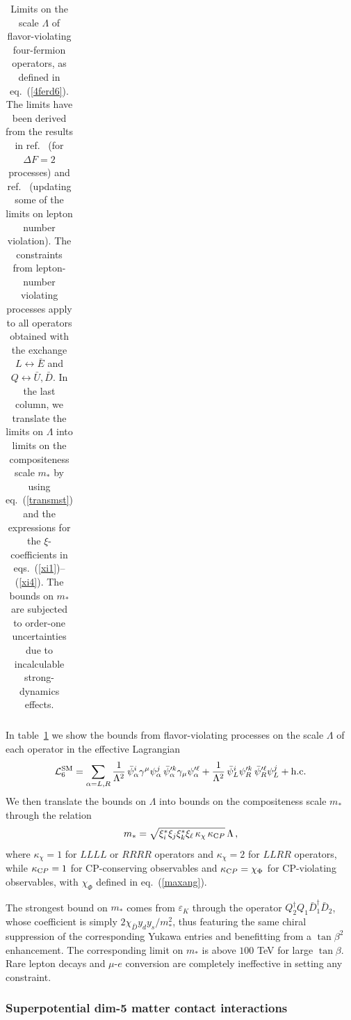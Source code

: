\documentclass[a4paper,12pt]{article}
\newcommand{\hc}{{\rm h.c.}}
\newcommand{\beq}{\begin{equation}}
\newcommand{\eeq}{\end{equation}}
\def\eq#1{eq.~(\ref{#1})}
\def\tab#1{table~\ref{#1}}
\def\eq#1{eq.~(\ref{#1})}
\def\mst{m_*}
\begin{document}
\begin{table}[t]
\begin{tabular}{|c|c|c|r|}
 \hline
 \end{tabular}
 \renewcommand{\arraystretch}{1}
 \caption{Limits on the scale $\Lambda$ of flavor-violating four-fermion operators, as defined in \eq{4ferd6}. The limits have been derived from the results in ref.~\cite{Bona:2024bue} (for $\Delta F =2$ processes) and ref.~\cite{Raidal:2008jk} (updating some of the limits on lepton number violation). The constraints from lepton-number violating processes apply to all operators obtained with the exchange $L \leftrightarrow {\bar E}$ and $Q \leftrightarrow {\bar U}, {\bar D}$. In the last column, we translate the limits on $\Lambda$ into limits on the compositeness scale $\mst$ by using \eq{transmst} and the expressions for the $\xi$-coefficients in eqs.~(\ref{xi1})--(\ref{xi4}). The bounds on $\mst$ are subjected to order-one uncertainties due to incalculable strong-dynamics effects.}
 \label{tab:4ferm}
 \end{table}
 
In \tab{tab:4ferm} we show the bounds from flavor-violating processes on the scale $\Lambda$ of each operator in the effective Lagrangian  
\beq
{\cal L}^{\rm SM}_6=
 \sum_{\alpha=L,R}\frac{1}{\Lambda^2}\, {\bar \psi}^{i}_{\alpha} \gamma^\mu {\psi}^j_{\alpha}\,
{\bar \psi}^{\prime k}_{\alpha} \gamma_\mu {\psi}^{\prime \ell}_{\alpha}+
\frac{1}{\Lambda^2}\, {\bar \psi}_L^i  \psi_R^{\prime k }\, {\bar \psi}_R^{\prime \ell}  \psi_L^j  + \hc 
\label{4ferd6}
\eeq
We then translate the bounds on $\Lambda$ into bounds on the compositeness scale $\mst$ through the relation 
\beq
\mst = \sqrt{\xi_i^* \xi_j \xi_k^* \xi_\ell \, \kappa_\chi \, \kappa_{\textrm CP}}\, \Lambda
\, ,
\label{transmst}
\eeq
where $\kappa_\chi =1$ for $LLLL$ or $RRRR$ operators and $\kappa_\chi =2$ for $LLRR$ operators, while $\kappa_{\textrm CP}=1$ for CP-conserving observables and $\kappa_{\textrm CP}=\chi_\Phi$ for CP-violating observables, with $\chi_\Phi$ defined in \eq{maxang}.

The strongest bound on $\mst$ comes from $\varepsilon_K$ through the operator $Q_2^\dagger Q_1\bar D_1^{\dagger}\bar D_2$, whose coefficient is simply $2\chi_{\bar D} y_d y_s/\mst^2$, thus featuring the same chiral suppression of the corresponding Yukawa entries and benefitting from a $\tan\beta^2$ enhancement. The corresponding limit on $\mst$ is above $100$ TeV  for large $\tan \beta$. 
Rare lepton decays and $\mu$-$e$ conversion are completely ineffective in setting any constraint.

\boldmath
\subsubsection*{Superpotential dim-5 matter contact interactions}
\unboldmath
\end{document}
